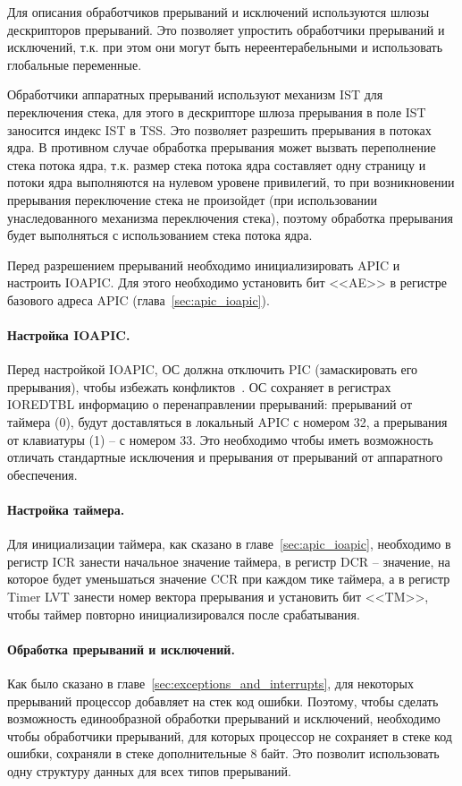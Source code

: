 Для описания обработчиков прерываний и исключений используются шлюзы дескрипторов прерываний.
Это позволяет упростить обработчики прерываний и исключений, т.к. при этом они могут быть
нереентерабельными и использовать глобальные переменные.

Обработчики аппаратных прерываний используют механизм IST для переключения стека, для этого
в дескрипторе шлюза прерывания в поле IST заносится индекс IST в TSS. Это позволяет
разрешить прерывания в потоках ядра. В противном случае обработка прерывания может вызвать
переполнение стека потока ядра, т.к. размер стека потока ядра составляет одну страницу
и потоки ядра выполняются на нулевом уровене привилегий, то при возникновении прерывания
переключение стека не произойдет (при использовании унаследованного механизма переключения стека),
поэтому обработка прерывания будет выполняться с использованием стека потока ядра.

Перед разрешением прерываний необходимо инициализировать APIC и настроить IOAPIC. Для этого
необходимо установить бит <<AE>> в регистре базового адреса APIC (глава~\ref{sec:apic_ioapic}).

\paragraph{Настройка IOAPIC.} Перед настройкой IOAPIC, ОС должна отключить PIC (замаскировать его прерывания),
чтобы избежать конфликтов~\cite{os_dev}. ОС сохраняет в регистрах IOREDTBL информацию о перенаправлении
прерываний: прерываний от таймера (0), будут доставляться в локальный APIC с номером 32, а прерывания от
клавиатуры (1) -- с номером 33. Это необходимо чтобы иметь возможность отличать стандартные исключения и
прерывания от прерываний от аппаратного обеспечения.

\paragraph{Настройка таймера.} Для инициализации таймера, как сказано в главе~\ref{sec:apic_ioapic},
необходимо в регистр ICR занести начальное значение таймера, в регистр DCR -- значение, на которое
будет уменьшаться значение CCR при каждом тике таймера, а в регистр Timer LVT занести номер вектора прерывания и
установить бит <<TM>>, чтобы таймер повторно инициализировался после срабатывания.

\paragraph{Обработка прерываний и исключений.} Как было сказано в главе~\ref{sec:exceptions_and_interrupts},
для некоторых прерываний процессор добавляет на стек код ошибки. Поэтому, чтобы сделать возможность единообразной
обработки прерываний и исключений, необходимо чтобы обработчики прерываний, для которых процессор не сохраняет в стеке
код ошибки, сохраняли в стеке дополнительные 8 байт. Это позволит использовать одну структуру данных для всех типов прерываний.

